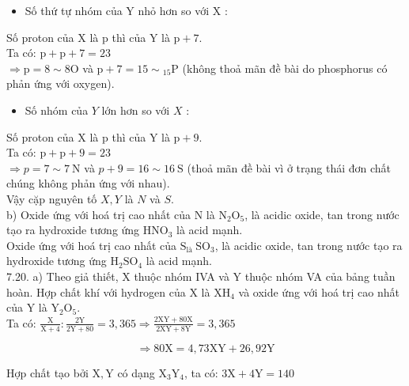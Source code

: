 \documentclass[10pt]{article}
\begin{document}
\begin{itemize}
  \item Số thứ tự nhóm của Y nhỏ hơn so với X :
\end{itemize}

Số proton của X là p thì của Y là $\mathrm{p}+7$.\\
Ta có: $\mathrm{p}+\mathrm{p}+7=23$\\
$\Rightarrow \mathrm{p}=8 \sim 8 \mathrm{O}$ và $\mathrm{p}+7=15 \sim{ }_{15} \mathrm{P}$ (không thoả mãn đề bài do phosphorus có phản ứng với oxygen).

\begin{itemize}
  \item Số nhóm của $Y$ lớn hơn so với $X$ :
\end{itemize}

Số proton của X là p thì của Y là $\mathrm{p}+9$.\\
Ta có: $\mathrm{p}+\mathrm{p}+9=23$\\
$\Rightarrow p=7 \sim 7 \mathrm{~N}$ và $p+9=16 \sim 16 \mathrm{~S}$ (thoả mãn đề bài vì ở trạng thái đơn chất chúng không phản ứng với nhau).\\
Vậy cặp nguyên tố $X, Y$ là $N$ và $S$.\\
b) Oxide ứng với hoá trị cao nhất của N là $\mathrm{N}_{2} \mathrm{O}_{5}$, là acidic oxide, tan trong nước tạo ra hydroxide tương ứng $\mathrm{HNO}_{3}$ là acid mạnh.\\
Oxide ứng với hoá trị cao nhất của $\mathrm{S}_{\text {là }} \mathrm{SO}_{3}$, là acidic oxide, tan trong nước tạo ra hydroxide tương ứng $\mathrm{H}_{2} \mathrm{SO}_{4}$ là acid mạnh.\\
7.20. a) Theo giả thiết, X thuộc nhóm IVA và Y thuộc nhóm VA của bảng tuần hoàn. Hợp chất khí với hydrogen của X là $\mathrm{XH}_{4}$ và oxide ứng với hoá trị cao nhất của Y là $\mathrm{Y}_{2} \mathrm{O}_{5}$.\\
Ta có: $\frac{\mathrm{X}}{\mathrm{X}+4}: \frac{2 \mathrm{Y}}{2 \mathrm{Y}+80}=3,365 \Rightarrow \frac{2 \mathrm{XY}+80 \mathrm{X}}{2 \mathrm{XY}+8 \mathrm{Y}}=3,365$


\begin{equation*}
\Rightarrow 80 \mathrm{X}=4,73 \mathrm{XY}+26,92 \mathrm{Y} \tag{I}
\end{equation*}


Hợp chất tạo bởi $\mathrm{X}, \mathrm{Y}$ có dạng $\mathrm{X}_{3} \mathrm{Y}_{4}$, ta có: $3 \mathrm{X}+4 \mathrm{Y}=140$
\end{document}
